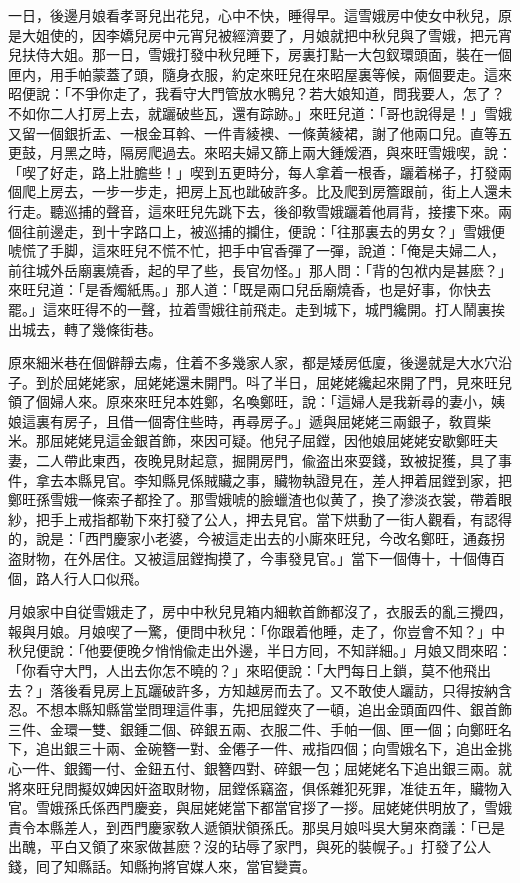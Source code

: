 一日，後邊月娘看孝哥兒出花兒，心中不快，睡得早。這雪娥房中使女中秋兒，原是大姐使的，因李嬌兒房中元宵兒被經濟要了，月娘就把中秋兒與了雪娥，把元宵兒扶侍大姐。那一日，雪娥打發中秋兒睡下，房裏打點一大包釵環頭面，裝在一個匣内，用手帕蒙蓋了頭，隨身衣服，約定來旺兒在來昭屋裏等候，兩個要走。這來昭便說：「不爭你走了，我看守大門管放水鴨兒？若大娘知道，問我要人，怎了？不如你二人打房上去，就躧破些瓦，還有踪跡。」來旺兒道：「哥也說得是！」雪娥又留一個銀折盂、一根金耳斡、一件青綾襖、一條黄綾裙，謝了他兩口兒。直等五更鼓，月黑之時，隔房爬過去。來昭夫婦又篩上兩大鍾煖酒，與來旺雪娥喫，說：「喫了好走，路上壯膽些！」喫到五更時分，每人拿着一根香，躧着梯子，打發兩個爬上房去，一步一步走，把房上瓦也跐破許多。比及爬到房簷跟前，街上人還未行走。聽巡捕的聲音，這來旺兒先跳下去，後卻敎雪娥躧着他肩背，接摟下來。兩個往前邊走，到十字路口上，被巡捕的攔住，便說：「往那裏去的男女？」雪娥便唬慌了手脚，這來旺兒不慌不忙，把手中官香彈了一彈，說道：「俺是夫婦二人，前往城外岳廟裏燒香，起的早了些，長官勿怪。」那人問：「背的包袱内是甚麽？」來旺兒道：「是香燭紙馬。」那人道：「既是兩口兒岳廟燒香，也是好事，你快去罷。」這來旺得不的一聲，拉着雪娥往前飛走。走到城下，城門纔開。打人鬧裏挨出城去，轉了幾條街巷。

原來細米巷在個僻靜去䖏，住着不多幾家人家，都是矮房低廈，後邊就是大水穴沿子。到於屈姥姥家，屈姥姥還未開門。呌了半日，屈姥姥纔起來開了門，見來旺兒領了個婦人來。原來來旺兒本姓鄭，名喚鄭旺，說：「這婦人是我新尋的妻小，姨娘這裏有房子，且借一個寄住些時，再尋房子。」遞與屈姥姥三兩銀子，敎買柴米。那屈姥姥見這金銀首飾，來因可疑。他兒子屈鏜，因他娘屈姥姥安歇鄭旺夫妻，二人帶此東西，夜晚見財起意，掘開房門，偸盗出來耍錢，致被捉獲，具了事件，拿去本縣見官。李知縣見係賊贜之事，贜物執證見在，差人押着屈鏜到家，把鄭旺孫雪娥一條索子都拴了。那雪娥唬的臉蠟渣也似黄了，換了滲淡衣裳，帶着眼紗，把手上戒指都勒下來打發了公人，押去見官。當下烘動了一街人觀看，有認得的，說是：「西門慶家小老婆，今被這走出去的小廝來旺兒，今改名鄭旺，通姦拐盗財物，在外居住。又被這屈鏜掏摸了，今事發見官。」當下一個傳十，十個傳百個，路人行人口似飛。

月娘家中自従雪娥走了，房中中秋兒見箱内細軟首飾都沒了，衣服丢的亂三攪四，報與月娘。月娘喫了一驚，便問中秋兒：「你跟着他睡，走了，你豈會不知？」中秋兒便說：「他要便晚夕悄悄偸走出外邊，半日方囘，不知詳細。」月娘又問來昭：「你看守大門，人出去你怎不曉的？」來昭便說：「大門每日上鎖，莫不他飛出去？」落後看見房上瓦躧破許多，方知越房而去了。又不敢使人躧訪，只得按納含忍。不想本縣知縣當堂問理這件事，先把屈鏜夾了一頓，追出金頭面四件、銀首飾三件、金環一雙、銀鍾二個、碎銀五兩、衣服二件、手帕一個、匣一個；向鄭旺名下，追出銀三十兩、金碗簪一對、金僊子一件、戒指四個；向雪娥名下，追出金挑心一件、銀鐲一付、金鈕五付、銀簪四對、碎銀一包；屈姥姥名下追出銀三兩。就將來旺兒問擬奴婢因奸盗取財物，屈鏜係竊盗，俱係雜犯死罪，准徒五年，贜物入官。雪娥孫氏係西門慶妾，與屈姥姥當下都當官拶了一拶。屈姥姥供明放了，雪娥責令本縣差人，到西門慶家敎人遞領狀領孫氏。那吳月娘呌吳大舅來商議：「已是出醜，平白又領了來家做甚麽？沒的玷辱了家門，與死的裝幌子。」打發了公人錢，囘了知縣話。知縣拘將官媒人來，當官變賣。

